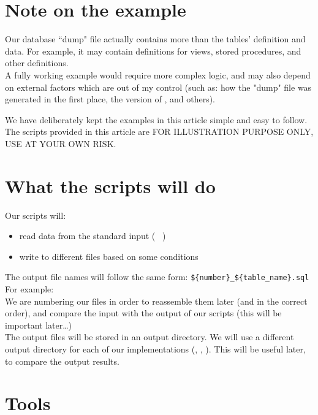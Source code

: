 \section*{Note on the example}

Our database ``dump" file actually contains more than the tables' definition and data. For example, it may contain definitions for views, stored procedures, and other definitions. \\

A fully working example would require more complex logic, and may also depend on external factors which are out of my control (such as: how the "dump" file was generated in the first place, the version of \mysqldump, and others).

We have deliberately kept the examples in this article simple and easy to follow. \\

The scripts provided in this article are FOR ILLUSTRATION PURPOSE ONLY, USE AT YOUR OWN RISK.


\section*{What the scripts will do}

Our scripts will:
\begin{itemize}
	\item read data from the standard input ( \stdin\ )
	\item write to different files based on some conditions
\end{itemize}


The output file names will follow the same form: \newline
\lstinline|${number}_${table_name}.sql| \\

For example:  \\


We are numbering our files in order to reassemble them later (and in the correct order), and compare the input with the output of our scripts (this will be important later\dots) \\


The output files will be stored in an output directory. 
We will use a different output directory for each of our implementations (, , ). This will be useful later, to compare the output results.


\section*{Tools}

